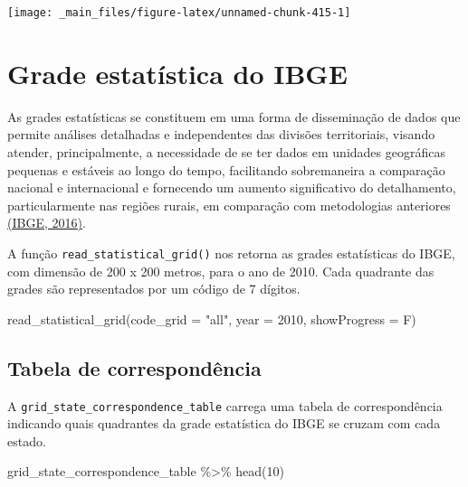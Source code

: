 \documentclass[
  brazilian,
]{book}
\newenvironment{Shaded}{\begin{snugshade}}{\end{snugshade}}
\newcommand{\AttributeTok}[1]{\textcolor[rgb]{0.77,0.63,0.00}{#1}}
\newcommand{\DecValTok}[1]{\textcolor[rgb]{0.00,0.00,0.81}{#1}}
\newcommand{\FunctionTok}[1]{\textcolor[rgb]{0.00,0.00,0.00}{#1}}
\newcommand{\NormalTok}[1]{#1}
\newcommand{\SpecialCharTok}[1]{\textcolor[rgb]{0.00,0.00,0.00}{#1}}
\newcommand{\StringTok}[1]{\textcolor[rgb]{0.31,0.60,0.02}{#1}}
\begin{document}
\begin{center}\texttt{[image: \_main\_files/figure-latex/unnamed-chunk-415-1]} \end{center}

\hypertarget{grade-estatuxedstica-do-ibge}{%
\section{Grade estatística do IBGE}\label{grade-estatuxedstica-do-ibge}}

As grades estatísticas se constituem em uma forma de disseminação de dados que
permite análises detalhadas e independentes das divisões territoriais, visando
atender, principalmente, a necessidade de se ter dados em unidades geográficas
pequenas e estáveis ao longo do tempo, facilitando sobremaneira a comparação
nacional e internacional e fornecendo um aumento significativo do detalhamento,
particularmente nas regiões rurais, em comparação com metodologias anteriores \href{https://geoftp.ibge.gov.br/recortes_para_fins_estatisticos/grade_estatistica/censo_2010/grade_estatistica.pdf}{(IBGE, 2016)}.

A função \texttt{read\_statistical\_grid()} nos retorna as grades estatísticas do IBGE, com dimensão de 200 x 200 metros, para o ano de 2010. Cada quadrante das grades são representados por um código de 7 dígitos.

\begin{Shaded}
\begin{Highlighting}[]
\FunctionTok{read\_statistical\_grid}\NormalTok{(}\AttributeTok{code\_grid =} \StringTok{"all"}\NormalTok{,}
                      \AttributeTok{year =} \DecValTok{2010}\NormalTok{,}
                      \AttributeTok{showProgress =}\NormalTok{ F)}
\end{Highlighting}
\end{Shaded}

\hypertarget{tabela-de-corresponduxeancia}{%
\subsection{Tabela de correspondência}\label{tabela-de-corresponduxeancia}}

A \texttt{grid\_state\_correspondence\_table} carrega uma tabela de correspondência indicando quais quadrantes da grade estatística do IBGE se cruzam com cada estado.

\begin{Shaded}
\begin{Highlighting}[]
\NormalTok{grid\_state\_correspondence\_table }\SpecialCharTok{\%\textgreater{}\%} \FunctionTok{head}\NormalTok{(}\DecValTok{10}\NormalTok{)}
\end{Highlighting}
\end{Shaded}
\end{document}
